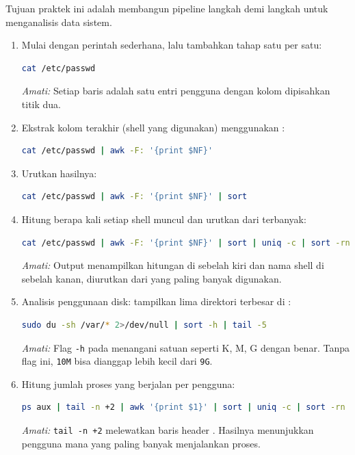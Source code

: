 Tujuan praktek ini adalah membangun pipeline langkah demi langkah untuk menganalisis data sistem.

\begin{enumerate}
    \item Mulai dengan perintah sederhana, lalu tambahkan tahap satu per satu:
\begin{lstlisting}[language=bash, caption={Pipeline bertahap: hitung pengguna per shell}]
cat /etc/passwd
\end{lstlisting}
    \textit{Amati:} Setiap baris adalah satu entri pengguna dengan kolom dipisahkan titik dua.

    \item Ekstrak kolom terakhir (shell yang digunakan) menggunakan :
\begin{lstlisting}[language=bash, caption={Ekstrak kolom shell dari /etc/passwd}]
cat /etc/passwd | awk -F: '{print $NF}'
\end{lstlisting}

    \item Urutkan hasilnya:
\begin{lstlisting}[language=bash, caption={Urutkan daftar shell}]
cat /etc/passwd | awk -F: '{print $NF}' | sort
\end{lstlisting}

    \item Hitung berapa kali setiap shell muncul dan urutkan dari terbanyak:
\begin{lstlisting}[language=bash, caption={Hitung kemunculan setiap shell}]
cat /etc/passwd | awk -F: '{print $NF}' | sort | uniq -c | sort -rn
\end{lstlisting}
    \textit{Amati:} Output menampilkan hitungan di sebelah kiri dan nama shell di sebelah kanan, diurutkan dari yang paling banyak digunakan.

    \item Analisis penggunaan disk: tampilkan lima direktori terbesar di :
\begin{lstlisting}[language=bash, caption={Lima direktori terbesar di /var}]
sudo du -sh /var/* 2>/dev/null | sort -h | tail -5
\end{lstlisting}
    \textit{Amati:} Flag \texttt{-h} pada  menangani satuan seperti K, M, G dengan benar. Tanpa flag ini, \texttt{10M} bisa dianggap lebih kecil dari \texttt{9G}.

    \item Hitung jumlah proses yang berjalan per pengguna:
\begin{lstlisting}[language=bash, caption={Jumlah proses per pengguna}]
ps aux | tail -n +2 | awk '{print $1}' | sort | uniq -c | sort -rn
\end{lstlisting}
    \textit{Amati:} \texttt{tail -n +2} melewatkan baris header . Hasilnya menunjukkan pengguna mana yang paling banyak menjalankan proses.
\end{enumerate}

